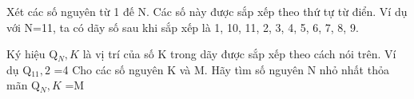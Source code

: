 Xét các số nguyên từ 1 đế N. Các số này được sắp xếp theo thứ tự từ điển. Ví dụ với N=11, ta có dãy số sau khi sắp xếp là 1, 10, 11, 2, 3, 4, 5, 6, 7, 8, 9.

Ký hiệu Q$_N,K $ là vị trí của số K trong dãy được sắp xếp theo cách nói trên. Ví dụ Q$_11,2 $ =4 Cho các số nguyên K và M. Hãy tìm số nguyên N nhỏ nhất thỏa mãn Q$_N,K $ =M